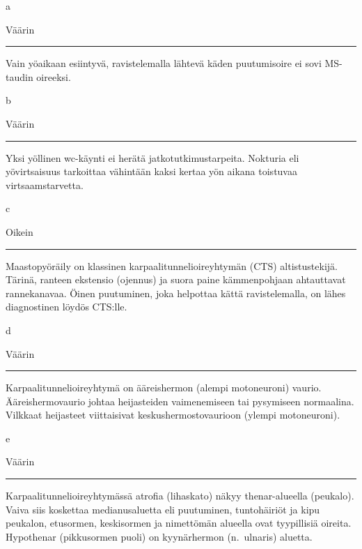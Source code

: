 \documentclass[
]{book}
\begin{document}
a

Väärin

\begin{center}\rule{0.5\linewidth}{0.5pt}\end{center}

Vain yöaikaan esiintyvä, ravistelemalla lähtevä käden puutumisoire ei sovi MS-taudin oireeksi.

b

Väärin

\begin{center}\rule{0.5\linewidth}{0.5pt}\end{center}

Yksi yöllinen wc-käynti ei herätä jatkotutkimustarpeita. Nokturia eli yövirtsaisuus tarkoittaa vähintään kaksi kertaa yön aikana toistuvaa virtsaamstarvetta.

c

Oikein

\begin{center}\rule{0.5\linewidth}{0.5pt}\end{center}

Maastopyöräily on klassinen karpaalitunnelioireyhtymän (CTS) altistustekijä. Tärinä, ranteen ekstensio (ojennus) ja suora paine kämmenpohjaan ahtauttavat rannekanavaa. Öinen puutuminen, joka helpottaa kättä ravistelemalla, on lähes diagnostinen löydös CTS:lle.

d

Väärin

\begin{center}\rule{0.5\linewidth}{0.5pt}\end{center}

Karpaalitunnelioireyhtymä on ääreishermon (alempi motoneuroni) vaurio. Ääreishermovaurio johtaa heijasteiden vaimenemiseen tai pysymiseen normaalina. Vilkkaat heijasteet viittaisivat keskushermostovaurioon (ylempi motoneuroni).

e

Väärin

\begin{center}\rule{0.5\linewidth}{0.5pt}\end{center}

Karpaalitunnelioireyhtymässä atrofia (lihaskato) näkyy thenar-alueella (peukalo). Vaiva siis koskettaa medianusaluetta eli puutuminen, tuntohäiriöt ja kipu peukalon, etusormen, keskisormen ja nimettömän alueella ovat tyypillisiä oireita. Hypothenar (pikkusormen puoli) on kyynärhermon (n.~ulnaris) aluetta.\\
\end{document}
